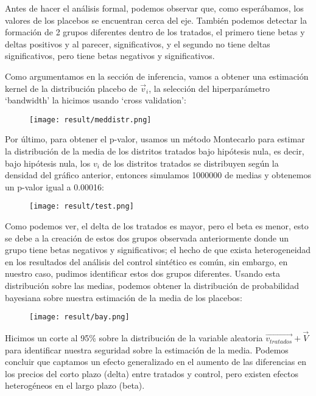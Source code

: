 \documentclass[12pt]{article}
\begin{document}
Antes de hacer el análisis formal, podemos observar que, como esperábamos, los valores de los placebos se encuentran cerca del eje. También podemos detectar la formación de 2 grupos diferentes dentro de los tratados, el primero tiene betas y deltas positivos y al parecer, significativos, y el segundo no tiene deltas significativos, pero tiene betas negativos y significativos.

Como argumentamos en la sección de inferencia, vamos a obtener una estimación kernel de la distribución placebo de {${\vec{v}}_i$}, la selección del hiperparámetro ‘bandwidth’ la hicimos usando ‘cross validation’:

\begin{figure}[H]
\centering
\texttt{[image: result/meddistr.png]}
\end{figure}

Por último, para obtener el p-valor, usamos un método Montecarlo para estimar la distribución de la media de los distritos tratados bajo hipótesis nula, es decir, bajo hipótesis nula, los {$v_i$} de los distritos tratados se distribuyen según la densidad del gráfico anterior, entonces simulamos 1000000 de medias y obtenemos un p-valor igual a 0.00016:

\begin{figure}[H]
\centering
\texttt{[image: result/test.png]}
\end{figure}

Como podemos ver, el delta de los tratados es mayor, pero el beta es menor, esto se debe a la creación de estos dos grupos observada anteriormente donde un grupo tiene betas negativos y significativos; el hecho de que exista heterogeneidad en los resultados del análisis del control sintético es común, sin embargo, en nuestro caso, pudimos identificar estos dos grupos diferentes. Usando esta distribución sobre las medias, podemos obtener la distribución de probabilidad bayesiana sobre nuestra estimación de la media de los placebos:

\begin{figure}[H]
\centering
\texttt{[image: result/bay.png]}
\end{figure}

Hicimos un corte al 95\% sobre la distribución de la variable aleatoria {$\vec{v_{tratados}}+\vec{V}$} para identificar nuestra seguridad sobre la estimación de la media. Podemos concluir que captamos un efecto generalizado en el aumento de las diferencias en los precios del corto plazo (delta) entre tratados y control, pero existen efectos heterogéneos en el largo plazo (beta).
\pagebreak
\end{document}

